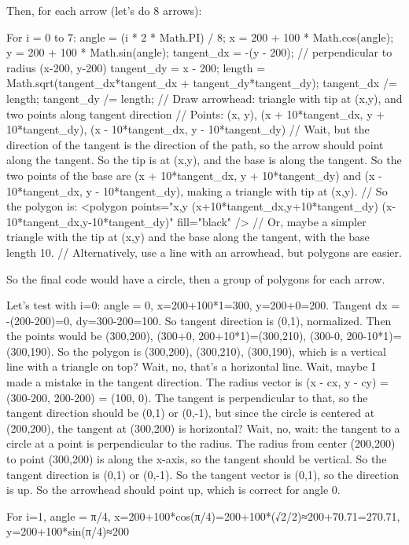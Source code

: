 Then, for each arrow (let's do 8 arrows):

For i = 0 to 7:
  angle = (i * 2 * Math.PI) / 8;
  x = 200 + 100 * Math.cos(angle);
  y = 200 + 100 * Math.sin(angle);
  tangent_dx = -(y - 200); // perpendicular to radius (x-200, y-200)
  tangent_dy = x - 200;
  length = Math.sqrt(tangent_dx*tangent_dx + tangent_dy*tangent_dy);
  tangent_dx /= length;
  tangent_dy /= length;
  // Draw arrowhead: triangle with tip at (x,y), and two points along tangent direction
  // Points: (x, y), (x + 10*tangent_dx, y + 10*tangent_dy), (x - 10*tangent_dx, y - 10*tangent_dy)
  // Wait, but the direction of the tangent is the direction of the path, so the arrow should point along the tangent. So the tip is at (x,y), and the base is along the tangent. So the two points of the base are (x + 10*tangent_dx, y + 10*tangent_dy) and (x - 10*tangent_dx, y - 10*tangent_dy), making a triangle with tip at (x,y).
  // So the polygon is:
  <polygon points="x,y (x+10*tangent_dx,y+10*tangent_dy) (x-10*tangent_dx,y-10*tangent_dy)" fill="black" />
  // Or, maybe a simpler triangle with the tip at (x,y) and the base along the tangent, with the base length 10.
  // Alternatively, use a line with an arrowhead, but polygons are easier.

So the final code would have a circle, then a group of polygons for each arrow.

Let's test with i=0:
angle = 0, x=200+100*1=300, y=200+0=200. Tangent dx = -(200-200)=0, dy=300-200=100. So tangent direction is (0,1), normalized. Then the points would be (300,200), (300+0, 200+10*1)=(300,210), (300-0, 200-10*1)=(300,190). So the polygon is (300,200), (300,210), (300,190), which is a vertical line with a triangle on top? Wait, no, that's a horizontal line. Wait, maybe I made a mistake in the tangent direction. The radius vector is (x - cx, y - cy) = (300-200, 200-200) = (100, 0). The tangent is perpendicular to that, so the tangent direction should be (0,1) or (0,-1), but since the circle is centered at (200,200), the tangent at (300,200) is horizontal? Wait, no, wait: the tangent to a circle at a point is perpendicular to the radius. The radius from center (200,200) to point (300,200) is along the x-axis, so the tangent should be vertical. So the tangent direction is (0,1) or (0,-1). So the tangent vector is (0,1), so the direction is up. So the arrowhead should point up, which is correct for angle 0.

For i=1, angle = π/4, x=200+100*cos(π/4)=200+100*(√2/2)≈200+70.71=270.71, y=200+100*sin(π/4)≈200